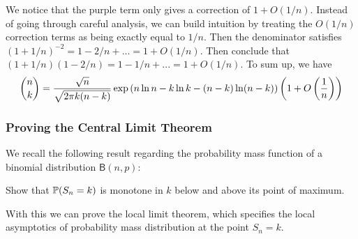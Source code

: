 We notice that the purple term only gives a correction of $1+O(1/n)$. Instead of going through careful analysis, we can build intuition by treating the $O(1/n)$ correction terms as being exactly equal to $1/n$. Then the denominator satisfies $(1+1/n)^{-2} = 1-2/n+... = 1+O(1/n)$. Then conclude that $(1+1/n)(1-2/n) = 1-1/n+... = 1+O(1/n)$. To sum up, we have
\begin{equation}
    {n\choose k} = \frac{\sqrt{n}}{\sqrt{2\pi k(n-k)}} \exp\left( n \ln n - k \ln k - (n-k) \ln (n-k) \right) \left( 1+O\left( \frac{1}{n} \right) \right)
\end{equation}

\subsubsection{Proving the Central Limit Theorem}

We recall the following result regarding the probability mass function of a binomial distribution $\mathsf{B}(n,p)$:
\begin{exercise} \label{ex:mono_of_bin_prob}
Show that $\mathbb{P}(S_n = k)$ is monotone in $k$ below and above its point of maximum.
\end{exercise}

With this we can prove the local limit theorem, which specifies the local asymptotics of probability mass distribution at the point $S_n = k$.

